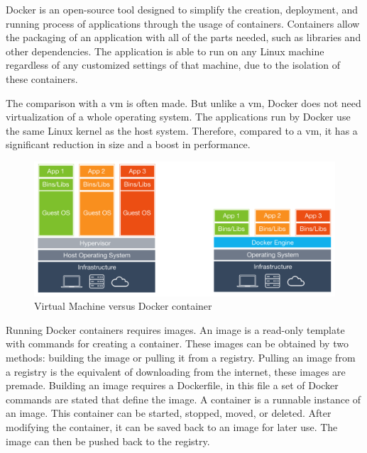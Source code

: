 Docker is an open\hyp{}source tool designed to simplify the creation, deployment, and running process of applications through the usage of containers. Containers allow the packaging of an application with all of the parts needed, such as libraries and other dependencies. The application is able to run on any Linux machine regardless of any customized settings of that machine, due to the isolation of these containers. \cite{opensource_what_is_docker}

The comparison with a \ac{vm} is often made. But unlike a \acs{vm}, Docker does not need virtualization of a whole operating system. The applications run by Docker use the same Linux kernel as the host system. Therefore, compared to a \acs{vm}, it has a significant reduction in size and a boost in performance. \cite{opensource_what_is_docker}

\begin{figure}[!h]
  \centering
  \includegraphics[width=\linewidth]{images/vm_vs_container.png}
  \caption{Virtual Machine versus Docker container \cite{docker_101}}
  \label{fig:vm_vs_container}
\end{figure}

\clearpage

Running Docker containers requires images. An image is a read\hyp{}only template with commands for creating a container. These images can be obtained by two methods: building the image or pulling it from a registry. Pulling an image from a registry is the equivalent of downloading from the internet, these images are premade. Building an image requires a Dockerfile, in this file a set of Docker commands are stated that define the image. A container is a runnable instance of an image. This container can be started, stopped, moved, or deleted. After modifying the container, it can be saved back to an image for later use. The image can then be pushed back to the registry. \cite{docker_get_started_overview}

